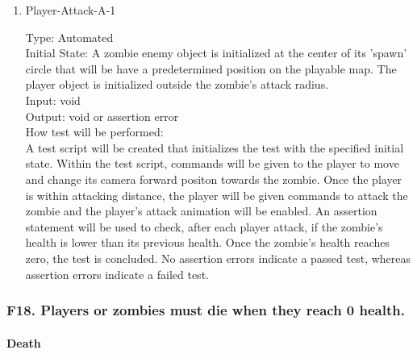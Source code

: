\documentclass[12pt, titlepage]{article}
\newcounter{ftnum}
\begin{document}
\begin{enumerate}

\item{Player-Attack-A-1\\}  \label{F17-1}

Type: Automated \\
					
Initial State: A zombie enemy object is initialized at the center of its 'spawn' circle that will be have a predetermined position on the playable map. The player object is initialized outside the zombie's attack radius.\\
					
Input: void \\
					
Output: void or assertion error \\
					
How test will be performed:\\  A test script will be created that initializes the test with the specified initial state. Within the test script, commands will be given to the player to move and change its camera forward positon towards the zombie. Once the player is within attacking distance, the player will be given commands to attack the zombie and the player's attack animation will be enabled. An assertion statement will be used to check, after each player attack, if the zombie's health is lower than its previous health. Once the zombie's health reaches zero, the test is concluded. No assertion errors indicate a passed test, whereas assertion errors indicate a failed test.\\

\end{enumerate}

\subsubsection{{\color{magenta} F18.} Players or zombies must die when they reach 0 health.} 

\paragraph{Death}
\end{document}
